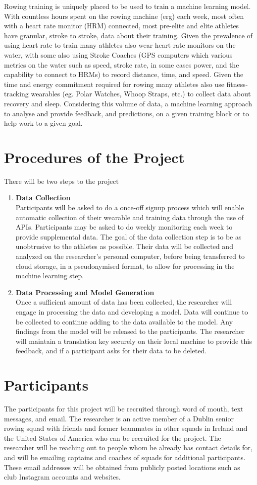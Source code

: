 Rowing training is uniquely placed to be used to train a machine learning model. With countless hours spent on the rowing machine (erg) each week, most often with a heart rate monitor (HRM) connected, most pre-elite and elite athletes have granular, stroke to stroke, data about their training. Given the prevalence of using heart rate to train many athletes also wear heart rate monitors on the water, with some also using Stroke Coaches (GPS computers which various metrics on the water such as speed, stroke rate, in some cases power, and the capability to connect to HRMs) to record distance, time, and speed. Given the time and energy commitment required for rowing many athletes also use fitness-tracking wearables (eg. Polar Watches, Whoop Straps, etc.) to collect data about recovery and sleep. Considering this volume of data, a machine learning approach to analyse and provide feedback, and predictions, on a given training block or to help work to a given goal.
\section*{Procedures of the Project}
There will be two steps to the project
\begin{enumerate}
    \item \textbf{Data Collection}\\Participants will be asked to do a once-off signup process which will enable automatic collection of their wearable and training data through the use of APIs. Participants may be asked to do weekly monitoring each week to provide supplemental data. The goal of the data collection step is to be as unobtrusive to the athletes as possible. Their data will be collected and analyzed on the researcher's personal computer, before being transferred to cloud storage, in a pseudonymised format, to allow for processing in the machine learning step.
    \item \textbf{Data Processing and Model Generation}\\Once a sufficient amount of data has been collected, the researcher will engage in processing the data and developing a model. Data will continue to be collected to continue adding to the data available to the model. Any findings from the model will be released to the participants. The researcher will maintain a translation key securely on their local machine to provide this feedback, and if a participant asks for their data to be deleted.
\end{enumerate}
\section*{Participants}
The participants for this project will be recruited through word of mouth, text messages, and email. The researcher is an active member of a Dublin senior rowing squad with friends and former teammates in other squads in Ireland and the United States of America who can be recruited for the project. The researcher will be reaching out to people whom he already has contact details for, and will be emailing captains and coaches of squads for additional participants. These email addresses will be obtained from publicly posted locations such as club Instagram accounts and websites.


